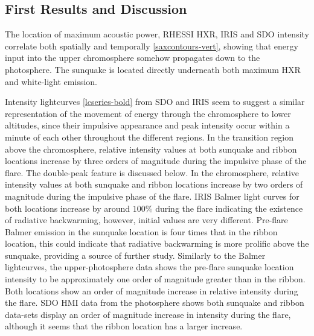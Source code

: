 \subsection{First Results and Discussion}
The location of maximum acoustic power, RHESSI HXR, IRIS and SDO intensity correlate both spatially and temporally \ref{saxcontours-vert}, showing that energy input into the upper chromosphere somehow propagates down to the photosphere. The sunquake is located directly underneath both maximum HXR and white-light emission. 

Intensity lightcurves \ref{lcseries-bold} from SDO and IRIS seem to suggest a similar representation of the movement of energy through the chromosphere to lower altitudes, since their impulsive appearance and peak intensity occur within a minute of each other throughout the different regions. In the transition region above the chromosphere, relative intensity values at both sunquake and ribbon locations increase by three orders of magnitude during the impulsive phase of the flare. The double-peak feature is discussed below. In the chromosphere, relative intensity values at both sunquake and ribbon locations increase by two orders of magnitude during the impulsive phase of the flare. IRIS Balmer light curves for both locations increase by around $100\%$ during the flare indicating the existence of radiative backwarming, however, initial values are very different. Pre-flare Balmer emission in the sunquake location is four times that in the ribbon location, this could indicate that radiative backwarming is more prolific above the sunquake, providing a source of further study. Similarly to the Balmer lightcurves, the upper-photosphere data shows the pre-flare sunquake location intensity to be approximately one order of magnitude greater than in the ribbon. Both locations show an order of magnitude increase in relative intensity during the flare. SDO HMI data from the photosphere shows both sunquake and ribbon data-sets display an order of magnitude increase in intensity during the flare, although it seems that the ribbon location has a larger increase.      




